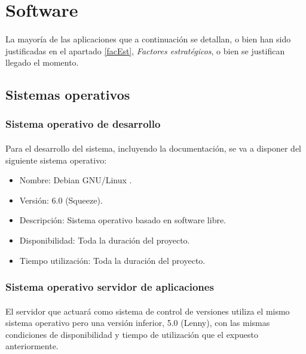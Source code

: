 \section{Software}

   \paragraph{}La mayoría de las aplicaciones que a continuación se detallan,
   o bien han sido justificadas en el apartado \ref{facEst}, \textit{Factores
   estratégicos}, o bien se justifican llegado el momento.

   \subsection{Sistemas operativos}

      \subsubsection{Sistema operativo de desarrollo}

      \paragraph{}Para el desarrollo del sistema, incluyendo la documentación,
      se va a disponer del siguiente sistema operativo:

      \begin{itemize}
         \item Nombre: Debian GNU/Linux \cite{debian}.
         \item Versión: 6.0 (Squeeze).
         \item Descripción: Sistema operativo basado en software libre.
         \item Disponibilidad: Toda la duración del proyecto.
         \item Tiempo utilización: Toda la duración del proyecto.
      \end{itemize}

      \subsubsection{Sistema operativo servidor de aplicaciones}

      \paragraph{}El servidor que actuará como sistema de control de versiones
      utiliza el mismo sistema operativo pero una versión inferior, 5.0 (Lenny),
      con las mismas condiciones de disponibilidad y tiempo de utilización que
      el expuesto anteriormente.

